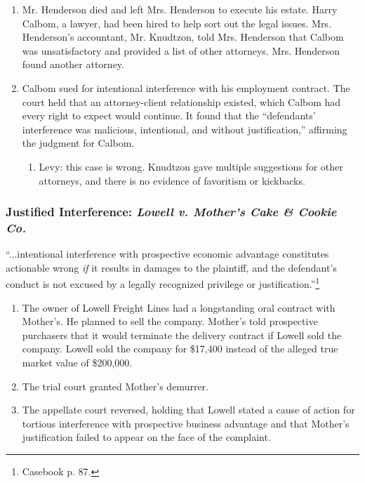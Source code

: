 \begin{enumerate}
    \item Mr. Henderson died and left Mrs. Henderson to execute his estate.  
    Harry Calbom, a lawyer, had been hired to help sort out the legal issues.  
    Mrs. Henderson's accountant, Mr. Knudtzon, told Mrs. Henderson that Calbom 
    was unsatisfactory and provided a list of other attorneys. Mrs. Henderson 
    found another attorney.
    \item Calbom sued for intentional interference with his employment 
    contract. The court held that an attorney-client relationship existed, 
    which Calbom had every right to expect would continue. It found that the 
    ``defendants' interference was malicious, intentional, and without 
    justification,'' affirming the judgment for Calbom.
    \begin{enumerate}
        \item Levy: this case is wrong. Knudtzon gave multiple suggestions for 
        other attorneys, and there is no evidence of favoritism or kickbacks.
    \end{enumerate}
\end{enumerate}

\subsubsection{Justified Interference: \emph{Lowell v. Mother's Cake \& Cookie 
Co.}}

``...intentional interference with prospective economic advantage constitutes 
actionable wrong \emph{if} it results in damages to the plaintiff, and the 
defendant's conduct is not excused by a legally recognized privilege or 
justification.''\footnote{Casebook p. 87.}

\begin{enumerate}
    \item The owner of Lowell Freight Lines had a longstanding oral contract 
    with Mother's. He planned to sell the company. Mother's told prospective 
    purchasers that it would terminate the delivery contract if Lowell sold 
    the company. Lowell sold the company for \$17,400 instead of the alleged 
    true market value of \$200,000.
    \item The trial court granted Mother's demurrer.
    \item The appellate court reversed, holding that Lowell stated a cause of 
    action for tortious interference with prospective business advantage and 
    that Mother's justification failed to appear on the face of the complaint.
\end{enumerate}


